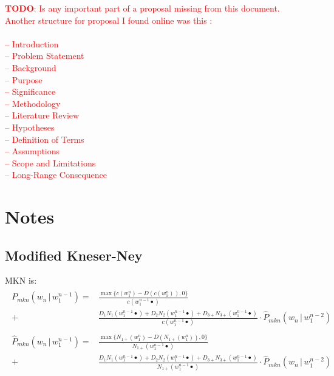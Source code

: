 \documentclass[11pt,a4paper]{article}
\newcommand\givenbase[1][]{\,#1\lvert\,}
\let\given\givenbase
\newcommand{\probSymbol}[1][]{P_{#1}}
\newcommand{\prob}[2][]{\probSymbol[#1](#2)}
\newcommand{\probCond}[3][]{\prob[#1]{#2 \given #3}}
\newcommand{\probSymbolLower}[1][]{\hat{P}_{#1}}
\newcommand{\probLower}[2][]{\probSymbolLower[#1](#2)}
\newcommand{\probCondLower}[3][]{\probLower[#1]{#2 \given #3}}
\newcommand{\todo}[1]{\textcolor{red}{\textbf{TODO}: #1}}
\begin{document}
\todo{Is any important part of a proposal missing from this document. Another
structure for proposal I found online was this :\\
\\
-- Introduction \\
-- Problem Statement \\
-- Background \\
-- Purpose \\
-- Significance \\
-- Methodology \\
-- Literature Review \\
-- Hypotheses \\
-- Definition of Terms \\
-- Assumptions \\
-- Scope and Limitations \\
-- Long-Range Consequence
}

\printbibliography

\clearpage
\section{Notes}

\subsection{Modified Kneser-Ney}

MKN is:
\begin{align}
  \begin{split}
    \probCond[mkn]{w_n}{w_1^{n-1}} =        &\frac{\max{\{c(w_1^n) - D(c(w_1^n)), 0\}}}
                                                  {c(w_1^{n-1} \bullet)} \\
                                          + &\frac{  D_1    N_1   (w_1^{n-1} \bullet)
                                                   + D_2    N_2   (w_1^{n-1} \bullet)
                                                   + D_{3+} N_{3+}(w_1^{n-1} \bullet)}
                                             {c(w_1^{n-1} \bullet)}
                                          \cdot \probCondLower[mkn]{w_n}{w_1^{n-2}}
  \end{split} \\
  \begin{split}
    \probCondLower[mkn]{w_n}{w_1^{n-1}} =   &\frac{\max{\{N_{1+}(w_1^n) - D(N_{1+}(w_1^n)), 0\}}}
                                                  {N_{1+}(w_1^{n-1} \bullet)} \\
                                          + &\frac{  D_1    N_1   (w_1^{n-1} \bullet)
                                                   + D_2    N_2   (w_1^{n-1} \bullet)
                                                   + D_{3+} N_{3+}(w_1^{n-1} \bullet)}
                                             {N_{1+}(w_1^{n-1} \bullet)}
                                          \cdot \probCondLower[mkn]{w_n}{w_1^{n-2}}
  \end{split}
\end{align}
\end{document}
